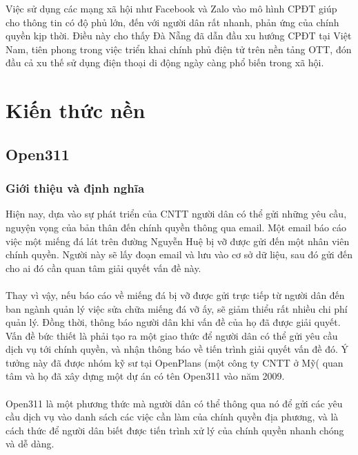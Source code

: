 \documentclass[a4paper]{article}
\begin{document}
Việc sử dụng các mạng xã hội như Facebook và Zalo vào mô hình CPĐT giúp cho thông tin có độ phủ lớn, đến với người dân rất nhanh, phản ứng của chính quyền kịp thời. Điều này cho thấy Đà Nẵng đã dẫn đầu xu hướng CPĐT tại Việt Nam, tiên phong trong việc triển khai chính phủ điện tử trên nền tảng OTT, đón đầu cả xu thế sử dụng điện thoại di động ngày càng phổ biến trong xã hội.
\section{Kiến thức nền}
\subsection{Open311}
\subsubsection{Giới thiệu và định nghĩa}
Hiện nay, dựa vào sự phát triển của CNTT người dân có thể gửi những yêu cầu, nguyện vọng của bản thân đến chính quyền thông qua email. Một email báo cáo việc một miếng đá lát trên đường Nguyễn Huệ bị vỡ được gửi đến một nhân viên chính quyền. Người này sẽ lấy đoạn email và lưu vào cơ sở dữ liệu, sau đó gửi đến cho ai đó cần quan tâm giải quyết vấn đề này.\\
\\
Thay vì vậy, nếu báo cáo về miếng đá bị vỡ được gửi trực tiếp từ người dân đến ban ngành quản lý việc sửa chữa miếng đá vỡ ấy, sẽ giảm thiểu rất nhiều chi phí quản lý. Đồng thời, thông báo người dân khi vấn đề của họ đã được giải quyết. Vấn đề bức thiết là phải tạo ra một giao thức để người dân có thể gửi yêu cầu dịch vụ tới chính quyền, và nhận thông báo về tiến trình giải quyết vấn đề đó. Ý tưởng này đã được nhóm kỹ sư tại OpenPlans (một công ty CNTT ở Mỹ( quan tâm và họ đã xây dựng một dự án có tên Open311 vào năm 2009.\\
\\
Open311 là một phương thức mà người dân có thể thông qua nó để gửi các yêu cầu dịch vụ vào danh sách các việc cần làm của chính quyền địa phương, và là cách thức để người dân biết được tiến trình xử lý của chính quyền nhanh chóng và dễ dàng.
\end{document}
